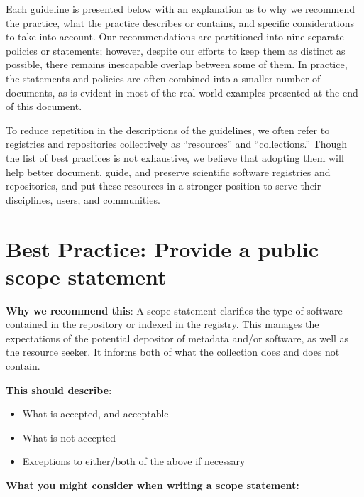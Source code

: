 \documentclass[11pt]{article}
\begin{document}
Each guideline is presented below with an explanation as to why we recommend the practice, what the practice describes or contains, and specific considerations to take into account.  Our recommendations are partitioned into nine separate policies or statements; however, despite our efforts to keep them as distinct as possible, there remains inescapable overlap between some of them. In practice, the statements and policies are often combined into a smaller number of documents, as is evident in most of the real-world examples presented at the end of this document.

To reduce repetition in the descriptions of the guidelines, we often refer to registries and repositories collectively as ``resources'' and ``collections.''  Though the list of best practices is not exhaustive, we believe that adopting them will help better document, guide, and preserve scientific software registries and repositories, and put these resources in a stronger position to serve their disciplines, users, and communities.


\section{Best Practice: Provide a public scope statement}
\label{best-practice-provide-a-public-scope-statement}

\textbf{Why we recommend this}: A scope statement clarifies the type of software contained in the repository or indexed in the registry. This manages the expectations of the potential depositor of metadata and/or software, as well as the resource seeker. It informs both of what the collection does and does not contain.

\textbf{This should describe}:

\begin{itemize}
\item What is accepted, and acceptable

\item What is not accepted

\item Exceptions to either/both of the above if necessary

\end{itemize}

\textbf{What you might consider when writing a scope statement: }
\end{document}
